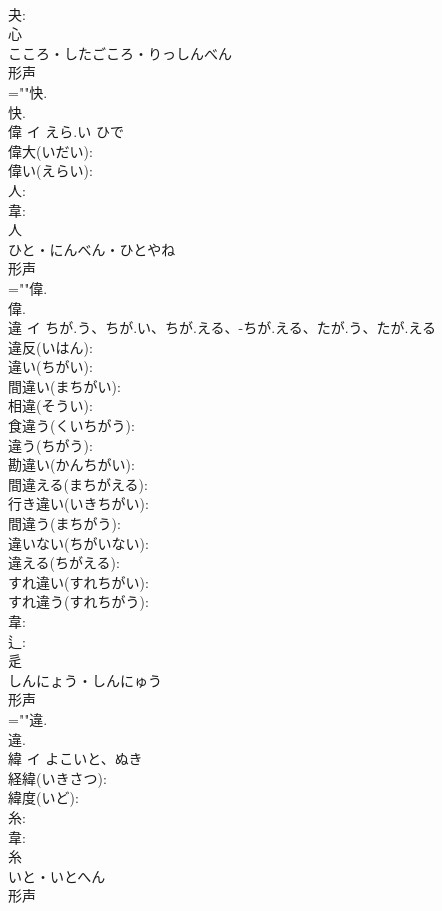 \documentclass[8pt]{extreport}
\begin{document}
\begin{CJK}{UTF8}{min}
\\	夬: 
\\	心	
\\	こころ・したごころ・りっしんべん	
\\	形声 
\\	=""快.
\\	快.
\\	偉	イ	えら.い	ひで	
\\	偉大(いだい): 
\\	偉い(えらい): 
\\	人: 
\\	韋: 
\\	人	
\\	ひと・にんべん・ひとやね	
\\	形声 
\\	=""偉.
\\	偉.
\\	違	イ	ちが.う、ちが.い、ちが.える、-ちが.える、たが.う、たが.える		
\\	違反(いはん): 
\\	違い(ちがい): 
\\	間違い(まちがい): 
\\	相違(そうい): 
\\	食違う(くいちがう): 
\\	違う(ちがう): 
\\	勘違い(かんちがい): 
\\	間違える(まちがえる): 
\\	行き違い(いきちがい): 
\\	間違う(まちがう): 
\\	違いない(ちがいない): 
\\	違える(ちがえる): 
\\	すれ違い(すれちがい): 
\\	すれ違う(すれちがう): 
\\	韋: 
\\	辶: 
\\	辵	
\\	しんにょう・しんにゅう	
\\	形声 
\\	=""違.
\\	違.
\\	緯	イ	よこいと、ぬき		
\\	経緯(いきさつ): 
\\	緯度(いど): 
\\	糸: 
\\	韋: 
\\	糸	
\\	いと・いとへん	
\\	形声 

\end{CJK}
\end{document}
